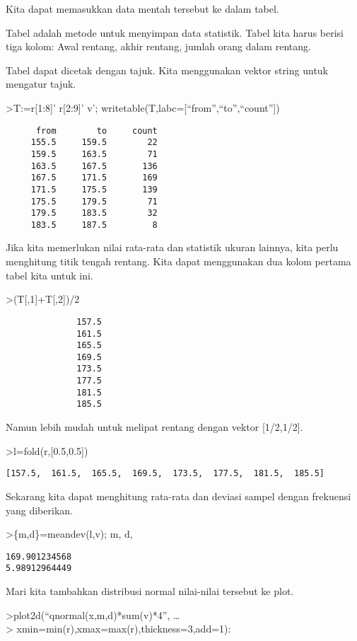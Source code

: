\documentclass[
]{book}
\begin{document}
Kita dapat memasukkan data mentah tersebut ke dalam tabel.

Tabel adalah metode untuk menyimpan data statistik. Tabel kita harus berisi tiga kolom: Awal rentang, akhir rentang, jumlah orang dalam rentang.

Tabel dapat dicetak dengan tajuk. Kita menggunakan vektor string untuk mengatur tajuk.

\textgreater T:=r{[}1:8{]}' \textbar{} r{[}2:9{]}' \textbar{} v'; writetable(T,labc={[}``from'',``to'',``count''{]})

\begin{verbatim}
      from        to     count
     155.5     159.5        22
     159.5     163.5        71
     163.5     167.5       136
     167.5     171.5       169
     171.5     175.5       139
     175.5     179.5        71
     179.5     183.5        32
     183.5     187.5         8
\end{verbatim}

Jika kita memerlukan nilai rata-rata dan statistik ukuran lainnya, kita perlu menghitung titik tengah rentang. Kita dapat menggunakan dua kolom pertama tabel kita untuk ini.

\textgreater(T{[},1{]}+T{[},2{]})/2

\begin{verbatim}
              157.5 
              161.5 
              165.5 
              169.5 
              173.5 
              177.5 
              181.5 
              185.5 
\end{verbatim}

Namun lebih mudah untuk melipat rentang dengan vektor {[}1/2,1/2{]}.

\textgreater l=fold(r,{[}0.5,0.5{]})

\begin{verbatim}
[157.5,  161.5,  165.5,  169.5,  173.5,  177.5,  181.5,  185.5]
\end{verbatim}

Sekarang kita dapat menghitung rata-rata dan deviasi sampel dengan frekuensi yang diberikan.

\textgreater\{m,d\}=meandev(l,v); m, d,

\begin{verbatim}
169.901234568
5.98912964449
\end{verbatim}

Mari kita tambahkan distribusi normal nilai-nilai tersebut ke plot.

\textgreater plot2d(``qnormal(x,m,d)*sum(v)*4'', \ldots{}\\
\textgreater{} xmin=min(r),xmax=max(r),thickness=3,add=1):
\end{document}
